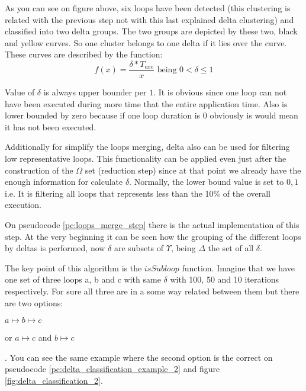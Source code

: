 As you can see on figure above, six loops have been detected (this clustering is
related with the previous step not with this last explained delta clustering) 
and classified into two delta groups. The two groups are depicted by these two,
black and yellow curves. So one cluster belongs to one delta if it lies over 
the curve. These curves are described by the function:
$$
f(x)=\frac{\delta*T_{exe}}{x} \text{ being }  0 < \delta \leq 1
$$

Value of $\delta$ is always upper bounder per $1$. It is obvious since one loop
can not have been executed during more time that the entire application time.
Also is lower bounded by zero because if one loop duration is 0 obviously is
would mean it has not been executed. 

Additionally for simplify the loops merging, delta also can be used for
filtering low representative loops. This functionality can be applied even
just after the construction of the $\Omega$ set (reduction step) since at that
point we already have the enough information for calculate $\delta$. Normally,
the lower bound value is set to $0,1$ i.e. It is filtering all loops that
represents less than the 10\% of the overall execution.

On pseudocode \ref{pc:loops_merge_step} there is the actual implementation of
this step. At the very beginning it can be seen how the grouping of the
different loops by deltas is performed, now $\delta$ are subsets of
$\Upsilon$, being $\Delta$ the set of all $\delta$.

\begin{pseudocode}{Loops merge step}{\Upsilon}
\label{pc:loops_merge_step}
    \Delta \GETS deltaClassification(\Upsilon) \\
    \FORALL \delta \in \Delta \DO 
    \BEGIN
         \\
        sort(\upsilon \in \delta) \\
        \FOR i \in [0, |\delta|-1) \DO
        \BEGIN
            \FOR j \in [i+1, |\delta|) \DO
            \BEGIN
              \IF isSubloop(\delta_{i}, \delta{j}) \THEN
                  \delta_{i} \mapsto \delta{j} \\
            \END
        \END
    \END
\end{pseudocode}

The key point of this
algorithm is the $isSubloop$ function. Imagine that we have one set of three loops
a, b and c with same $\delta$ with 100, 50 and 10 iterations respectively. 
For sure all three are in a some way related between them but there are two options:
\begin{enumerate*}[label=\roman*)]
    \item $a \mapsto b \mapsto c$
    \item or $a \mapsto c$ and $b \mapsto c$
\end{enumerate*}. You can see the same example where the second option is the
correct on pseudocode
\ref{pc:delta_classification_example_2} and figure
\ref{fig:delta_classification_2}.


